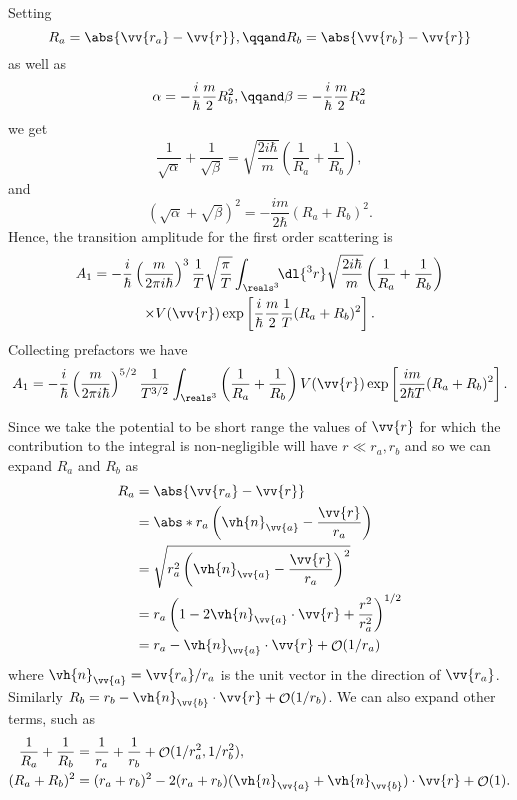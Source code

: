 \documentclass[fleqn]{NotesClass}
\newcommand*{\order}{\mathop{\mathcal{O}}}
\begin{document}
    Setting
    \begin{equation}
        R_a = \abs{\vv{r_a} - \vv{r}}, \qqand R_b = \abs{\vv{r_b} - \vv{r}}
    \end{equation}
    as well as
    \begin{equation}
        \alpha = -\frac{i}{\hbar} \frac{m}{2} R_b^2, \qqand \beta = -\frac{i}{\hbar} \frac{m}{2} R_a^2
    \end{equation}
    we get
    \begin{equation}
        \frac{1}{\sqrt{\alpha}} + \frac{1}{\sqrt{\beta}} = \sqrt{\frac{2i\hbar}{m}} \left( \frac{1}{R_a} + \frac{1}{R_b} \right),
    \end{equation}
    and
    \begin{equation}
        (\sqrt{\alpha} + \sqrt{\beta})^2 = -\frac{im}{2\hbar}(R_a + R_b)^2.
    \end{equation}
    Hence, the transition amplitude for the first order scattering is
    \begin{multline}
        A_1 = -\frac{i}{\hbar} \left( \frac{m}{2\pi i\hbar} \right)^{3} \frac{1}{T}\sqrt{\frac{\pi}{T}} \int_{\reals^3} \!\! \dl{^3r} \sqrt{\frac{2i\hbar}{m}} \left( \frac{1}{R_a} + \frac{1}{R_b} \right)\\
        \times V(\vv{r}) \exp\left[ \frac{i}{\hbar} \frac{m}{2} \frac{1}{T} (R_a + R_b)^2 \right].
    \end{multline}
    Collecting prefactors we have
    \begin{equation}
        A_1 = -\frac{i}{\hbar} \left( \frac{m}{2\pi i\hbar} \right)^{5/2} \frac{1}{T^{3/2}} \int_{\reals^3} \left( \frac{1}{R_a} + \frac{1}{R_b} \right) V(\vv{r}) \exp\left[ \frac{im}{2\hbar T}(R_a + R_b)^2 \right].
    \end{equation}
    
    Since we take the potential to be short range the values of \(\vv{r}\) for which the contribution to the integral is non-negligible will have \(r \ll r_a, r_b\) and so we can expand \(R_a\) and \(R_b\) as
    \begin{align}
        R_a &= \abs{\vv{r_a} - \vv{r}}\\
        &= \abs*{r_a\left(\vh{n}_{\vv{a}} - \frac{\vv{r}}{r_a}\right)}\\
        &= \sqrt{r_a^2\left(\vh{n}_{\vv{a}} - \frac{\vv{r}}{r_a}\right)^2}\\
        &= r_a\left( 1 - 2\vh{n}_{\vv{a}} \cdot \vv{r} + \frac{r^2}{r_a^2} \right)^{1/2}\\
        &= r_a - \vh{n}_{\vv{a}} \cdot \vv{r} + \order(1/r_a)
    \end{align}
    where \(\vh{n}_{\vv{a}} = \vv{r_a}/r_a\) is the unit vector in the direction of \(\vv{r_a}\).
    Similarly \(R_b = r_b - \vh{n}_{\vv{b}} \cdot \vv{r} + \order(1/r_b)\).
    We can also expand other terms, such as
    \begin{align}
        \frac{1}{R_a} + \frac{1}{R_b} &= \frac{1}{r_a} + \frac{1}{r_b} + \order(1/r_a^2, 1/r_b^2),\\
        (R_a + R_b)^2 &= (r_a + r_b)^2 - 2(r_a + r_b)(\vh{n}_{\vv{a}} + \vh{n}_{\vv{b}}) \cdot \vv{r} + \order(1).
    \end{align}
    
\end{document}
